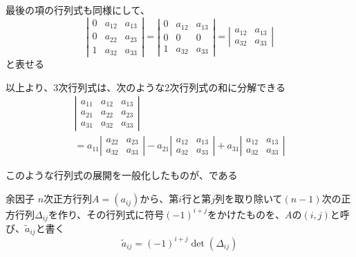 \documentclass[../../../topic_linear-algebra]{subfiles}
\begin{document}
最後の項の行列式も同様にして、
\begin{equation*}
  \left| \begin{matrix}
    0 & a_{12} & a_{13} \\
    0 & a_{22} & a_{23} \\
    1 & a_{32} & a_{33}
  \end{matrix} \right| = \left| \begin{matrix}
    0 & a_{12} & a_{13} \\
    0 & 0      & 0      \\
    1 & a_{32} & a_{33}
  \end{matrix} \right|= \left| \begin{matrix}
    a_{12} & a_{13} \\
    a_{32} & a_{33}
  \end{matrix} \right|
\end{equation*}
と表せる

\br

以上より、3次行列式は、次のような2次行列式の和に分解できる
\begin{multline*}
  \left| \begin{matrix}
    a_{11} & a_{12} & a_{13} \\
    a_{21} & a_{22} & a_{23} \\
    a_{31} & a_{32} & a_{33}
  \end{matrix} \right| \\ = a_{11} \left| \begin{matrix}
    a_{22} & a_{23} \\
    a_{32} & a_{33}
  \end{matrix} \right| - a_{21} \left| \begin{matrix}
    a_{12} & a_{13} \\
    a_{32} & a_{33}
  \end{matrix} \right| + a_{31} \left| \begin{matrix}
    a_{12} & a_{13} \\
    a_{32} & a_{33}
  \end{matrix} \right|
\end{multline*}

\sectionline

このような行列式の展開を一般化したものが、である

\begin{definition*}{余因子}
  $n$次正方行列$A = (a_{ij})$から、第$i$行と第$j$列を取り除いて$(n-1)$次の正方行列$\Delta_{ij}$を作り、その行列式に符号$(-1)^{i+j}$をかけたものを、$A$の$(i,j)$と呼び、$\tilde{a}_{ij}$と書く
  \begin{equation*}
    \tilde{a}_{ij} = (-1)^{i+j} \det(\Delta_{ij})
  \end{equation*}
\end{definition*}
\end{document}
